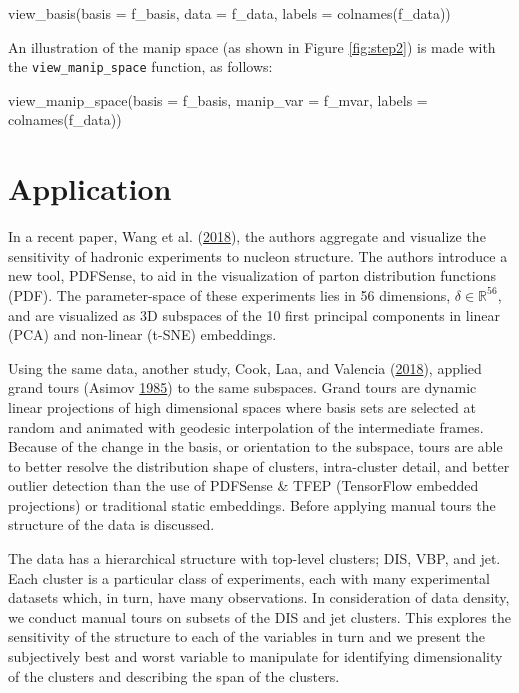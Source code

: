 \begin{Schunk}
\begin{Sinput}
view_basis(basis = f_basis, 
           data = f_data,
           labels = colnames(f_data))
\end{Sinput}
\end{Schunk}

\noindent An illustration of the manip space (as shown in Figure
\ref{fig:step2}) is made with the \texttt{view\_manip\_space} function,
as follows:

\begin{Schunk}
\begin{Sinput}

view_manip_space(basis = f_basis, 
                 manip_var = f_mvar, 
                 labels = colnames(f_data))
\end{Sinput}
\end{Schunk}

\hypertarget{sec:application}{%
\section{Application}\label{sec:application}}

In a recent paper, Wang et al.
(\protect\hyperlink{ref-wang_mapping_2018}{2018}), the authors aggregate
and visualize the sensitivity of hadronic experiments to nucleon
structure. The authors introduce a new tool, PDFSense, to aid in the
visualization of parton distribution functions (PDF). The
parameter-space of these experiments lies in 56 dimensions,
\(\delta \in \mathbb{R}^{56}\), and are visualized as 3D subspaces of
the 10 first principal components in linear (PCA) and non-linear (t-SNE)
embeddings.

Using the same data, another study, Cook, Laa, and Valencia
(\protect\hyperlink{ref-cook_dynamical_2018}{2018}), applied grand tours
(Asimov \protect\hyperlink{ref-asimov_grand_1985}{1985}) to the same
subspaces. Grand tours are dynamic linear projections of high
dimensional spaces where basis sets are selected at random and animated
with geodesic interpolation of the intermediate frames. Because of the
change in the basis, or orientation to the subspace, tours are able to
better resolve the distribution shape of clusters, intra-cluster detail,
and better outlier detection than the use of PDFSense \& TFEP
(TensorFlow embedded projections) or traditional static embeddings.
Before applying manual tours the structure of the data is discussed.

The data has a hierarchical structure with top-level clusters; DIS, VBP,
and jet. Each cluster is a particular class of experiments, each with
many experimental datasets which, in turn, have many observations. In
consideration of data density, we conduct manual tours on subsets of the
DIS and jet clusters. This explores the sensitivity of the structure to
each of the variables in turn and we present the subjectively best and
worst variable to manipulate for identifying dimensionality of the
clusters and describing the span of the clusters.

